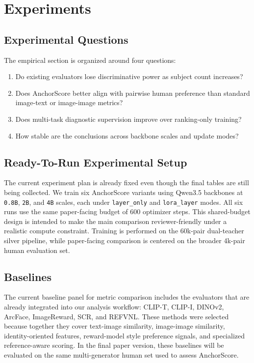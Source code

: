 \section{Experiments}

\subsection{Experimental Questions}
The empirical section is organized around four questions:
\begin{enumerate}
    \item Do existing evaluators lose discriminative power as subject count increases?
    \item Does AnchorScore better align with pairwise human preference than standard image-text or image-image metrics?
    \item Does multi-task diagnostic supervision improve over ranking-only training?
    \item How stable are the conclusions across backbone scales and update modes?
\end{enumerate}

\subsection{Ready-To-Run Experimental Setup}
The current experiment plan is already fixed even though the final tables are still being collected. We train six AnchorScore variants using Qwen3.5 backbones at \texttt{0.8B}, \texttt{2B}, and \texttt{4B} scales, each under \texttt{layer\_only} and \texttt{lora\_layer} modes. All six runs use the same paper-facing budget of 600 optimizer steps. This shared-budget design is intended to make the main comparison reviewer-friendly under a realistic compute constraint. Training is performed on the 60k-pair dual-teacher silver pipeline, while paper-facing comparison is centered on the broader 4k-pair human evaluation set.

\subsection{Baselines}
The current baseline panel for metric comparison includes the evaluators that are already integrated into our analysis workflow: CLIP-T, CLIP-I, DINOv2, ArcFace, ImageReward, SCR, and REFVNL. These methods were selected because together they cover text-image similarity, image-image similarity, identity-oriented features, reward-model style preference signals, and specialized reference-aware scoring. In the final paper version, these baselines will be evaluated on the same multi-generator human set used to assess AnchorScore.

